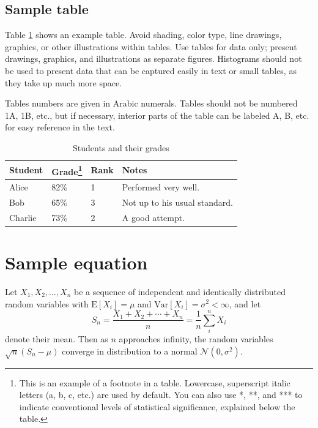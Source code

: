 \documentclass[9pt,twocolumn,twoside,lineno]{gsajnl}
\begin{document}
\subsection{Sample table}

Table \ref{tab:shape-functions} shows an example table. Avoid shading, color type, line drawings, graphics, or other illustrations within tables. Use tables for data only; present drawings, graphics, and illustrations as separate figures. Histograms should not be used to present data that can be captured easily in text or small tables, as they take up much more space.

Tables numbers are given in Arabic numerals. Tables should not be numbered 1A, 1B, etc., but if necessary, interior parts of the table can be labeled A, B, etc. for easy reference in the text.

\begin{table}[p]
\centering
\caption{Students and their grades}
\begin{tableminipage}{\textwidth}
\begin{tabularx}{\textwidth}{@{}XXXX@{}}
\hline
{\bf Student} & {\bf Grade}\footnote{This is an example of a footnote in a table. Lowercase, superscript italic letters (a, b, c, etc.) are used by default. You can also use *, **, and *** to indicate conventional levels of statistical significance, explained below the table.} & {\bf Rank} & {\bf Notes} \\
\hline
Alice & 82\% & 1 & Performed very well.\\
Bob & 65\% & 3 & Not up to his usual standard.\\
Charlie & 73\% & 2 & A good attempt.\\
\hline
\end{tabularx}
  \label{tab:shape-functions}
\end{tableminipage}
\end{table}

\section{Sample equation}

Let $X_1, X_2, \ldots, X_n$ be a sequence of independent and identically distributed random variables with $\text{E}[X_i] = \mu$ and $\text{Var}[X_i] = \sigma^2 < \infty$, and let
\begin{equation}
S_n = \frac{X_1 + X_2 + \cdots + X_n}{n}
      = \frac{1}{n}\sum_{i}^{n} X_i
\label{eq:refname1}
\end{equation}
denote their mean. Then as $n$ approaches infinity, the random variables $\sqrt{n}(S_n - \mu)$ converge in distribution to a normal $\mathcal{N}(0, \sigma^2)$.
\end{document}
